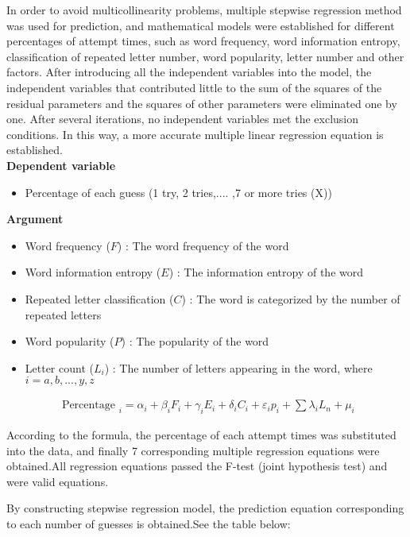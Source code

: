 \documentclass{mcmthesis}
\begin{document}
In order to avoid multicollinearity problems, multiple stepwise regression method was used for prediction, and mathematical models were established for different percentages of attempt times, such as word frequency, word information entropy, classification of repeated letter number, word popularity, letter number and other factors. After introducing all the independent variables into the model, the independent variables that contributed little to the sum of the squares of the residual parameters and the squares of other parameters were eliminated one by one. After several iterations, no independent variables met the exclusion conditions. In this way, a more accurate multiple linear regression equation is established.\\
\textbf{Dependent variable}
\begin{itemize}
	\item Percentage of each guess (1 try, 2 tries,.... ,7 or more tries (X))
\end{itemize}
\textbf{Argument}
\begin{itemize}
	\item Word frequency ($F$) : The word frequency of the word
	\item Word information entropy ($E$) : The information entropy of the word
	\item Repeated letter classification ($C$) : The word is categorized by the number of repeated letters
	\item Word popularity ($P$) : The popularity of the word
	\item Letter count ($L_i$) : The number of letters appearing in the word, where $i=a,b,...,y,z$
\end{itemize}
\begin{eqnarray}
	\text { Percentage }_i  =  \alpha_{i}+\beta_{i} F_{i}+\gamma_{i} E_{i}+\delta_{i} C_{i}+\varepsilon _{i} p_{i}+\sum \lambda _{i} L_{n}+\mu_{i}
\end{eqnarray}

According to the formula, the percentage of each attempt times was substituted into the data, and finally 7 corresponding multiple regression equations were obtained.All regression equations passed the F-test (joint hypothesis test) and were valid equations.

By constructing stepwise regression model, the prediction equation corresponding to each number of guesses is obtained.See the table below:
\end{document}
